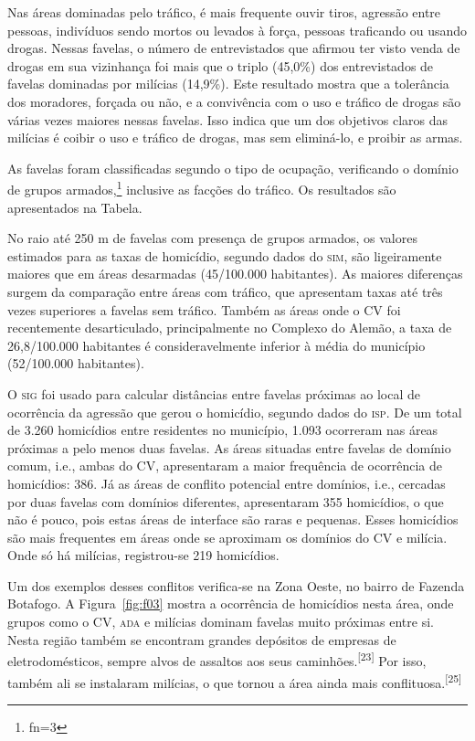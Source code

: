 \documentclass{article}
\makeatletter
\newcommand{\fn}{\afterassignment\fn@aux\count0=}
\newcommand{\fn@aux}{\csname fn\the\count0\endcsname}
\makeatother
\begin{document}
Nas áreas dominadas pelo tráfico, é mais frequente ouvir tiros, agressão entre
pessoas, indivíduos sendo mortos ou levados à força, pessoas traficando ou
usando drogas. Nessas favelas, o número de entrevistados que afirmou ter visto
venda de drogas em sua vizinhança foi mais que o triplo (45,0\%) dos
entrevistados de favelas dominadas por milícias (14,9\%). Este resultado mostra
que a tolerância dos moradores, forçada ou não, e a convivência com o uso e
tráfico de drogas são várias vezes maiores nessas favelas. Isso indica que um
dos objetivos claros das milícias é coibir o uso e tráfico de drogas, mas sem
eliminá-lo, e proibir as armas.

As favelas foram classificadas segundo o tipo de ocupação, verificando o domínio
de grupos armados,\footnote{\fn3}
inclusive as facções do tráfico. Os resultados são apresentados na Tabela.

No raio até 250 m de favelas com presença de grupos armados, os valores
estimados para as taxas de homicídio, segundo dados do \textsc{sim}, são ligeiramente
maiores que em áreas desarmadas (45/100.000 habitantes). As maiores diferenças
surgem da comparação entre áreas com tráfico, que apresentam taxas até três
vezes superiores a favelas sem tráfico. Também as áreas onde o CV foi
recentemente desarticulado, principalmente no Complexo do Alemão, a taxa de
26,8/100.000 habitantes é consideravelmente inferior à média do município
(52/100.000 habitantes).

O \textsc{sig} foi usado para calcular distâncias entre favelas próximas ao local de
ocorrência da agressão que gerou o homicídio, segundo dados do \textsc{isp}. De um total
de 3.260 homicídios entre residentes no município, 1.093 ocorreram nas áreas
próximas a pelo menos duas favelas. As áreas situadas entre favelas de domínio
comum, i.e., ambas do CV, apresentaram a maior frequência de ocorrência de
homicídios: 386. Já as áreas de conflito potencial entre domínios, i.e.,
cercadas por duas favelas com domínios diferentes, apresentaram 355 homicídios,
o que não é pouco, pois estas áreas de interface são raras e pequenas. Esses
homicídios são mais frequentes em áreas onde se aproximam os domínios do CV e
milícia. Onde só há milícias, registrou-se 219 homicídios.

Um dos exemplos desses conflitos verifica-se na Zona Oeste, no bairro de Fazenda
Botafogo. A Figura~\ref{fig:f03}
mostra a ocorrência de homicídios nesta área, onde grupos como o CV, \textsc{ada} e
milícias dominam favelas muito próximas entre si. Nesta região também se
encontram grandes depósitos de empresas de eletrodomésticos, sempre alvos de
assaltos aos seus caminhões.\textsuperscript{[}\textsuperscript{23}\textsuperscript{]}
Por isso, também ali se instalaram milícias, o que tornou a área ainda mais
conflituosa.\textsuperscript{[}\textsuperscript{25}\textsuperscript{]}
\end{document}
